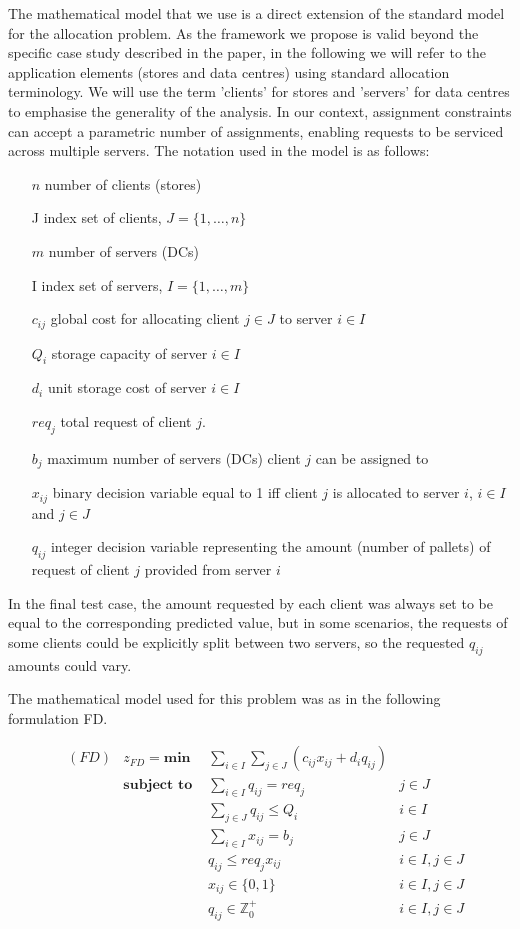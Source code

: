 \documentclass[preprint,11pt,authoryear]{elsarticle}
\begin{document}
The mathematical model that we use is a direct extension of the standard model for the allocation problem. As the framework we propose is valid beyond the specific case study described in the paper, in the following we will refer to the application elements (stores and data centres) using standard allocation terminology. We will use the term 'clients' for stores and 'servers' for data centres to emphasise the generality of the analysis. In our context, assignment constraints can accept a parametric number of assignments, enabling requests to be serviced across multiple servers. The notation used in the model is as follows:

\begin{enumerate}
	\item[$n$] number of clients (stores)
	\item[J] index set of clients, $J=\{1, \ldots, n\}$
	\item[$m$] number of servers (DCs)
	\item[I] index set of servers, $I=\{1, \ldots, m\}$
	\item[$c_{ij}$] global cost for allocating client $j \in J$ to server $i \in I$
	\item[$Q_i$] storage capacity of server $i \in I$
	\item[$d_i$] unit storage cost of server $i \in I$
	\item[$req_j$] total request of client $j$.
	\item[$b_j$] maximum number of servers (DCs) client $j$ can be assigned to
	\item[$x_{ij}$] binary decision variable equal to 1 iff client $j$ is allocated to server $i$, $i \in I$ and $j \in J$
	\item[$q_{ij}$] integer decision variable representing the amount (number of pallets) of request of client $j$ provided from server $i$
\end{enumerate}

In the final test case, the amount requested by each client was always set to be equal to the corresponding predicted value, but in some scenarios, the requests of some clients could be explicitly split between two servers, so the requested $q_{ij}$ amounts could vary.

The mathematical model used for this problem was as in the following formulation FD.

\begin{align}
	&(FD) & z_{FD} = \textbf{min } & \sum_{i \in I} \sum_{j \in J} ( c_{ij}x_{ij} + d_i q_{ij} ) \label{ALLobj}\\
	& &  \textbf{subject to }
	& \sum_{i \in I} q_{ij} = req_j & j \in J  \label{ALLrequest}\\
	& &  & \sum_{j \in J}q_{ij} \leq Q_i & i \in I \label{ALLcapacity}\\
	& &  & \sum_{i \in I} x_{ij} = b_j & j \in J  \label{ALLnumserv}\\
	& &  & q_{ij} \leq req_j x_{ij} & i \in I, j \in J \label{ALLcontin}\\
	& &  & x_{ij} \in \{0,1\} & i\in I, j \in J \label{ALLx}\\
	& &  & q_{ij} \in \mathbb{Z}^+_0 & i\in I, j \in J \label{ALLq}
\end{align}
\end{document}
